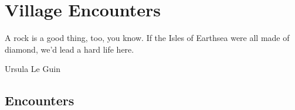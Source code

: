 \chapter{Village Encounters}

\epigraph{A rock is a good thing, too, you know. If the Isles of Earthsea were all made of diamond, we'd lead a hard life here.}{Ursula Le Guin}

\renewcommand{\sqarea}{Villages}

\sqtoc

\setcounter{encnum}{1}
\renewcommand{\encsymbol}{\ding{170}}

\section{Encounters}

